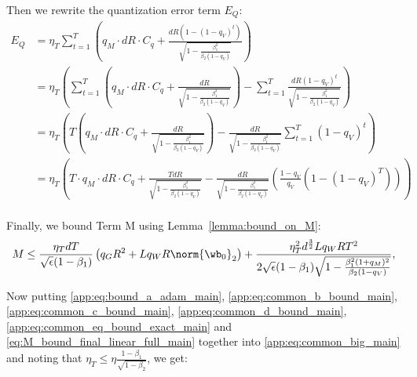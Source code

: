 \documentclass[11pt, letterpaper]{article}
\begin{document}
Then we rewrite the quantization error term $E_Q$:
\begin{align}
\nonumber
E_Q & = \eta_T \sum_{t=1}^T \left( q_M \cdot dR \cdot C_q + \frac{dR(1-(1-q_V)^t)}{\sqrt{1-\frac{\beta_1^2}{\beta_2(1-q_V)}}} \right)\\ 
\nonumber
&= \eta_T \left( \sum_{t=1}^T \left( q_M \cdot dR \cdot C_q + \frac{dR}{\sqrt{1-\frac{\beta_1^2}{\beta_2(1-q_V)}}} \right) - \sum_{t=1}^T \frac{dR(1-q_V)^t}{\sqrt{1-\frac{\beta_1^2}{\beta_2(1-q_V)}}} \right) \\
\nonumber
&= \eta_T \left( T \left( q_M \cdot dR \cdot C_q + \frac{dR}{\sqrt{1-\frac{\beta_1^2}{\beta_2(1-q_V)}}} \right) - \frac{dR}{\sqrt{1-\frac{\beta_1^2}{\beta_2(1-q_V)}}} \sum_{t=1}^T (1-q_V)^t \right) \\
\nonumber
&= \eta_T \left( T \cdot q_M \cdot dR \cdot C_q + \frac{TdR}{\sqrt{1-\frac{\beta_1^2}{\beta_2(1-q_V)}}}    - \frac{dR}{\sqrt{1-\frac{\beta_1^2}{\beta_2(1-q_V)}}} \left( \frac{1-q_V}{q_V}(1-(1-q_V)^T) \right) \right) \\
\label{app:eq:common_eq_bound_exact_main}
\end{align}

Finally, we bound Term M using Lemma~\ref{lemma:bound_on_M}:
\begin{align}\label{eq:M_bound_final_linear_full_main}
    M \le \frac{\eta_T d T}{\sqrt{\epsilon}(1-\beta_1)} \left( q_G R^2 + L q_W R \norm{\wb_0}_2 \right) + \frac{\eta_T^2 d^\frac{3}{2} L q_W R T^2}{2\sqrt{\epsilon}(1-\beta_1)\sqrt{1-\frac{\beta_1^2(1+q_M)^2}{\beta_2(1-q_V)}}},
\end{align}


Now putting \eqref{app:eq:bound_a_adam_main}, \eqref{app:eq:common_b_bound_main}, \eqref{app:eq:common_c_bound_main}, \eqref{app:eq:common_d_bound_main}, \eqref{app:eq:common_eq_bound_exact_main} and \eqref{eq:M_bound_final_linear_full_main} together into \eqref{app:eq:common_big_main} and noting that $\eta_T \leq \eta \frac{1- \beta_1}{\sqrt{1 - \beta_2}}$, we get:
\end{document}
